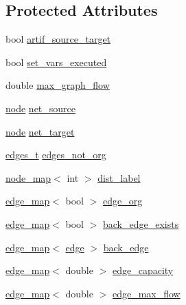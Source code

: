 \subsection*{Protected Attributes}
\begin{DoxyCompactItemize}
\item 
bool \mbox{\hyperlink{classmaxflow__sap_a5d19d178a861e252c84fc392e19bf0ae}{artif\+\_\+source\+\_\+target}}
\item 
bool \mbox{\hyperlink{classmaxflow__sap_aad7f764b9e9732b996f402ffadbf5b70}{set\+\_\+vars\+\_\+executed}}
\item 
double \mbox{\hyperlink{classmaxflow__sap_a77c650fd11632352a1228f2cbd38caf1}{max\+\_\+graph\+\_\+flow}}
\item 
\mbox{\hyperlink{classnode}{node}} \mbox{\hyperlink{classmaxflow__sap_abd4266c76dbd73f7f719d3a4fba2655d}{net\+\_\+source}}
\item 
\mbox{\hyperlink{classnode}{node}} \mbox{\hyperlink{classmaxflow__sap_a8d0e8f448ed29a1329a70c8f4f496c2c}{net\+\_\+target}}
\item 
\mbox{\hyperlink{edge_8h_a8f9587479bda6cf612c103494b3858e3}{edges\+\_\+t}} \mbox{\hyperlink{classmaxflow__sap_ac97c4038560f49eee2e781d12a64fdf5}{edges\+\_\+not\+\_\+org}}
\item 
\mbox{\hyperlink{classnode__map}{node\+\_\+map}}$<$ int $>$ \mbox{\hyperlink{classmaxflow__sap_a14eef09823ae0ac69348c2b3a60e6ca3}{dist\+\_\+label}}
\item 
\mbox{\hyperlink{classedge__map}{edge\+\_\+map}}$<$ bool $>$ \mbox{\hyperlink{classmaxflow__sap_ac445d8c2f7e2080e890a9cdf7413c372}{edge\+\_\+org}}
\item 
\mbox{\hyperlink{classedge__map}{edge\+\_\+map}}$<$ bool $>$ \mbox{\hyperlink{classmaxflow__sap_a13f2b98efc2a4f62fab4ac391ca83a51}{back\+\_\+edge\+\_\+exists}}
\item 
\mbox{\hyperlink{classedge__map}{edge\+\_\+map}}$<$ \mbox{\hyperlink{classedge}{edge}} $>$ \mbox{\hyperlink{classmaxflow__sap_a34793d0909089155a9957deed7c0e1b7}{back\+\_\+edge}}
\item 
\mbox{\hyperlink{classedge__map}{edge\+\_\+map}}$<$ double $>$ \mbox{\hyperlink{classmaxflow__sap_acfa95eef5ea5bf7814c4dabd3994bc63}{edge\+\_\+capacity}}
\item 
\mbox{\hyperlink{classedge__map}{edge\+\_\+map}}$<$ double $>$ \mbox{\hyperlink{classmaxflow__sap_a25820db833a98efc69fc3edb79fc49d3}{edge\+\_\+max\+\_\+flow}}
\end{DoxyCompactItemize}


